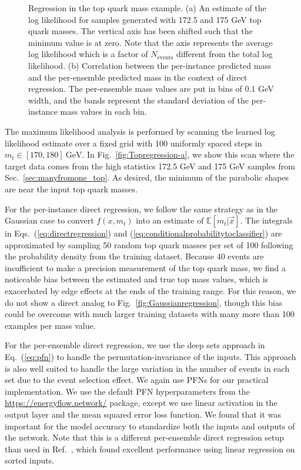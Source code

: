 \documentclass[aps,prx,reprint,preprintnumbers,superscriptaddress,nofootinbib,longbibliography,floatfix]{revtex4-2}
\DeclareRobustCommand{\Sec}[1]{Sec.~\ref{sec:#1}}
\DeclareRobustCommand{\Fig}[1]{Fig.~\ref{fig:#1}}
\DeclareRobustCommand{\Eq}[1]{Eq.~(\ref{eq:#1})}
\DeclareRobustCommand{\Eqs}[2]{Eqs.~(\ref{eq:#1}) and (\ref{eq:#2})}
\DeclareRobustCommand{\Ref}[1]{Ref.~\cite{#1}}
\begin{document}
 \begin{figure*}[t]
 \centering
  $\qquad$
 \caption{Regression in the top quark mass example.
 (a) An estimate of the log likelihood for samples generated with 172.5 and 175 GeV top quark masses.
 The vertical axis has been shifted such that the minimum value is at zero.
 Note that the axis represents the average log likelihood which is a factor of $N_\text{events}$ different from the total log likelihood.
 (b) Correlation between the per-instance predicted mass and the per-ensemble predicted mass in the context of direct regression.  The per-ensemble mass values are put in bins of 0.1 GeV width, and the bands represent the standard deviation of the per-instance mass values in each bin.}
 \label{fig:Topregression}
 \end{figure*} 

The maximum likelihood analysis is performed by scanning the learned log likelihood estimate over a fixed grid with 100 uniformly spaced steps in $m_t \in [170,180]~\text{GeV}$.
%
In \Fig{Topregression-a}, we show this scan where the target data comes from the high statistics 172.5 GeV and 175 GeV samples from \Sec{manyfromone_top}.
%
As desired, the minimum of the parabolic shapes are near the input top quark masses.


For the per-instance direct regression, we follow the same strategy as in the Gaussian case to convert $f(x,m_t)$ into an estimate of $\mathbb{E}[m_t|\vec{x}]$.
%
The integrals in \Eqs{directregression}{conditionalprobabilitytoclassifier} are approximated by sampling 50 random top quark masses per set of 100 following the probability density from the training dataset.  
%
Because 40 events are insufficient to make a precision measurement of the top quark mass, we find a noticeable bias between the estimated and true top mass values, which is exacerbated by edge effects at the ends of the training range.
%
For this reason, we do not show a direct analog to \Fig{Gaussianregression}, though this bias could be overcome with much larger training datasets with many more than 100 examples per mass value.



For the per-ensemble direct regression, we use the deep sets approach in \Eq{pfn} to handle the permutation-invariance of the inputs.
%
This approach is also well suited to handle the large variation in the number of events in each set due to the event selection effect.
%
We again use PFNs for our practical implementation.
%
We use the default PFN hyperparameters from the \url{https://energyflow.network/} package, except we use linear activation in the output layer and the mean squared error loss function.
%
We found that it was important for the model accuracy to standardize both the inputs and outputs of the network.
%
Note that this is a different per-ensemble direct regression setup than used in \Ref{Flesher:2020kuy}, which found excellent performance using linear regression on sorted inputs.
\end{document}
